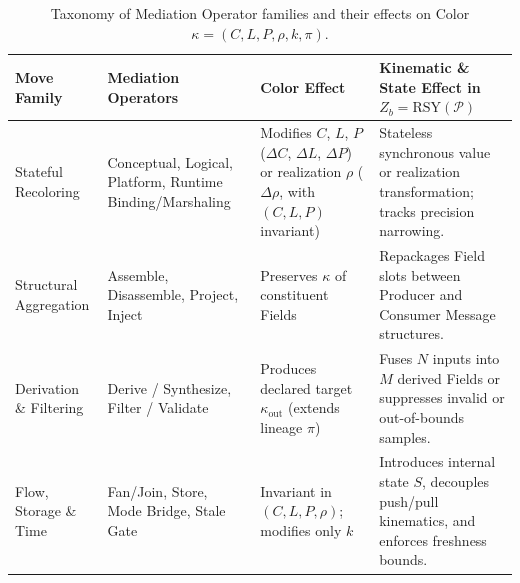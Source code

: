 \begin{table}[t]
\centering
\caption{Taxonomy of Mediation Operator families and their effects on Color $\kappa = (C, L, P, \rho, k, \pi)$.}
\label{tab:legal-moves}
\footnotesize
\begin{tabularx}{\linewidth}{@{}>{\raggedright\arraybackslash}p{2.7cm} >{\raggedright\arraybackslash}p{2.8cm} >{\raggedright\arraybackslash}p{3.1cm} >{\raggedright\arraybackslash}X@{}}
\toprule
\textbf{Move Family} & \textbf{Mediation Operators} & \textbf{Color Effect} & \textbf{Kinematic \& State Effect in $Z_b = \mathrm{RSY}(\mathcal{P})$} \\
\midrule
Stateful Recoloring & Conceptual, Logical, Platform, Runtime Binding/Marshaling & Modifies $C$, $L$, $P$ ($\Delta C$, $\Delta L$, $\Delta P$) or realization $\rho$ ($\Delta\rho$, with $(C, L, P)$ invariant) & Stateless synchronous value or realization transformation; tracks precision narrowing. \\
\addlinespace[2pt]
Structural Aggregation & Assemble, Disassemble, Project, Inject & Preserves $\kappa$ of constituent Fields & Repackages Field slots between Producer and Consumer Message structures. \\
\addlinespace[2pt]
Derivation \& Filtering & Derive / Synthesize, Filter / Validate & Produces declared target $\kappa_{\text{out}}$ (extends lineage $\pi$) & Fuses $N$ inputs into $M$ derived Fields or suppresses invalid or out-of-bounds samples. \\
\addlinespace[2pt]
Flow, Storage \& Time & Fan/Join, Store, Mode Bridge, Stale Gate & Invariant in $(C, L, P, \rho)$; modifies only $k$ & Introduces internal state $S$, decouples push/pull kinematics, and enforces freshness bounds. \\
\bottomrule
\end{tabularx}
\end{table}

